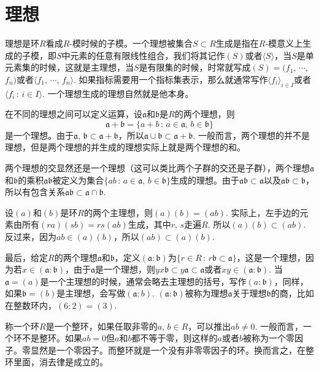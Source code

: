 \section{理想}

\para 理想是环$R$看成$R$-模时候的子模。一个理想被集合$S\subset R$生成是指在$R$-模意义上生成的子模，即$S$中元素的任意有限线性组合，我们将其记作$(S)$或者$\langle S\rangle$，当$S$是单元素集的时候，这就是主理想，当$S$是有限集的时候，时常就写成$(S)=(f_1$, $\cdots$, $f_n)$或者$\langle f_1$, $\cdots$, $f_n\rangle$. 如果指标需要用一个指标集表示，那么就通常写作$\langle f_i\rangle_{i\in I}$或者$\langle f_i\,:\,i\in I\rangle$. 一个理想生成的理想自然就是他本身。

\para 在不同的理想之间可以定义运算，设$\mathfrak{a}$和$\mathfrak{b}$是$R$的两个理想，则
\[
\mathfrak{a}+\mathfrak{b}=\{a+b\,:\,a\in\mathfrak{a},\,b\in\mathfrak{b}\}
\]
是一个理想。由于$\mathfrak{a}$, $\mathfrak{b}\subset \mathfrak{a}+\mathfrak{b}$，所以$\mathfrak{a}\cup\mathfrak{b}\subset \mathfrak{a}+\mathfrak{b}$. 一般而言，两个理想的并不是理想，但是两个理想的并生成的理想实际上就是两个理想的和。

两个理想的交显然还是一个理想（这可以类比两个子群的交还是子群），两个理想$\mathfrak{a}$和$\mathfrak{b}$的乘积$\mathfrak{a}\mathfrak{b}$被定义为集合$\{ab\,:\,a\in\mathfrak{a},\,b\in\mathfrak{b}\}$生成的理想。由于$\mathfrak{a}\mathfrak{b}\subset \mathfrak{a}$以及$\mathfrak{a}\mathfrak{b}\subset \mathfrak{b}$，所以有包含关系$\mathfrak{a}\mathfrak{b}\subset \mathfrak{a}\cap \mathfrak{b}$.

设$(a)$和$(b)$是环$R$的两个主理想，则$(a)(b)=(ab)$. 实际上，左手边的元素由所有$(ra)(sb)=rs(ab)$生成，其中$r$, $s$走遍$R$. 所以$(a)(b)\subset (ab)$. 反过来，因为$ab\in (a)(b)$，所以$(ab)\subset (a)(b)$.

最后，给定$R$的两个理想$\mathfrak{a}$和$\mathfrak{b}$，定义$(\mathfrak{a}:\mathfrak{b})$为$\{r\in R\,:\, r\mathfrak{b}\subset \mathfrak{a}\}$，这是一个理想，因为若$x\in (\mathfrak{a}:\mathfrak{b})$，由于$\mathfrak{a}$是一个理想，则$yx\mathfrak{b}\subset y\mathfrak{a}\subset \mathfrak{a}$或者$xy\in (\mathfrak{a}:\mathfrak{b})$. 当$\mathfrak{a}=(a)$是一个主理想的时候，通常会略去主理想的括号，写作$(a:\mathfrak{b})$，同样，如果$\mathfrak{b}=(b)$是主理想，会写做$(\mathfrak{a}:b)$. $(\mathfrak{a}:\mathfrak{b})$被称为理想$\mathfrak{a}$关于理想$\mathfrak{b}$的商，比如在整数环内，$(6:2)=(3)$.

\para 称一个环$R$是一个整环，如果任取非零的$a$, $b\in R$，可以推出$ab\neq 0$. 一般而言，一个环不是整环。如果$ab=0$但$a$和$b$都不等于零，则这样的$a$或者$b$被称为一个零因子。零显然是一个零因子。而整环就是一个没有非零零因子的环。换而言之，在整环里面，消去律是成立的。

